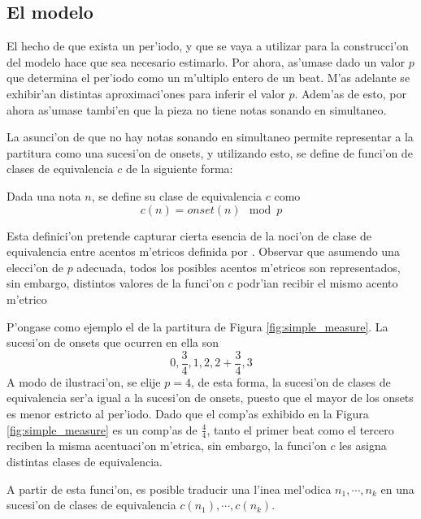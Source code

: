 \subsection{El modelo}
\label{sec:rythm_model}
El hecho de que exista un per'iodo, y que se vaya a utilizar para la construcci'on del modelo hace que sea necesario estimarlo. Por ahora, as'umase dado un valor 
$p$ que determina el per'iodo como un m'ultiplo entero de un beat. M'as adelante se exhibir'an distintas aproximaci'ones para inferir el valor $p$. Adem'as
de esto, por ahora as'umase tambi'en que la pieza no tiene notas sonando en simultaneo.

La asunci'on de que no hay notas sonando en simultaneo permite representar a la partitura como una sucesi'on de onsets, y utilizando esto, se define 
de funci'on de clases de equivalencia $c$ de la siguiente forma:

\begin{definition}
Dada una nota $n$, se define su clase de equivalencia $c$ como $$c(n) = onset(n)\mod p$$
\end{definition}

Esta definici'on pretende capturar cierta esencia de la noci'on de clase de equivalencia entre acentos m'etricos definida por \cite{Benjamin84}. Observar que asumendo 
una elecci'on de $p$ adecuada, todos los posibles acentos m'etricos son representados, sin embargo, distintos valores de la funci'on $c$ podr'ian recibir el mismo acento m'etrico 

P'ongase como ejemplo el de la partitura de Figura \ref{fig:simple_measure}. La sucesi'on de onsets que ocurren en ella son 
$$0, \frac{3}{4}, 1, 2, 2+\frac{3}{4}, 3$$ 
A modo de ilustraci'on, se elije $p=4$, de esta forma, la sucesi'on de clases de equivalencia ser'a igual a la sucesi'on de onsets, puesto que el mayor de los onsets es menor 
estricto al per'iodo. Dado que el comp'as exhibido en la Figura \ref{fig:simple_measure} es un comp'as de $\frac{4}{4}$, tanto el primer beat como el tercero reciben la misma 
acentuaci'on m'etrica, sin embargo, la funci'on $c$ les asigna distintas clases de equivalencia.


\begin{imagen}
\end{imagen}

A partir de esta funci'on, es posible traducir una l'inea mel'odica $n_1,\cdots,n_k$ en una sucesi'on de clases de equivalencia $c(n_1),\cdots,c(n_k)$. 

